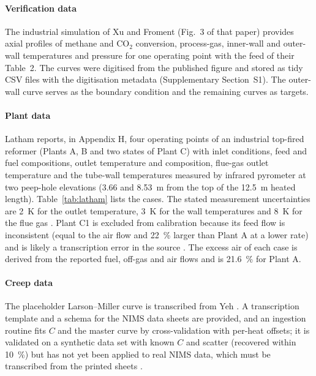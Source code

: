 \paragraph{Verification data} The industrial simulation of Xu and Froment \cite{xu1989b} (Fig.~3 of that paper) provides axial
profiles of methane and CO$_2$ conversion, process-gas, inner-wall and outer-wall temperatures and pressure for one operating point
with the feed of their Table~2. The curves were digitised from the published figure  and stored as tidy CSV files with the digitisation metadata (Supplementary Section~S1). The outer-wall curve serves as
the boundary condition and the remaining curves as targets.

\paragraph{Plant data} Latham \cite{latham2008} reports, in Appendix H, four operating points of an industrial top-fired reformer
(Plants A, B and two states of Plant C) with inlet conditions, feed and fuel compositions, outlet temperature and composition,
flue-gas outlet temperature and the tube-wall temperatures measured by infrared pyrometer at two peep-hole elevations (3.66 and
\SI{8.53}{m} from the top of the \SI{12.5}{m} heated length). Table~\ref{tab:latham} lists the cases. The stated measurement
uncertainties are \SI{2}{K} for the outlet temperature, \SI{3}{K} for the wall temperatures and \SI{8}{K} for the flue gas
. Plant C1 is excluded from calibration because
its feed flow is inconsistent (equal to the air flow and \SI{22}{\percent} larger than Plant A at a lower rate) and is likely a
transcription error in the source . The excess air of each case is derived from the
reported fuel, off-gas and air flows and is \SI{21.6}{\percent} for Plant A.

\paragraph{Creep data} The placeholder Larson--Miller curve is transcribed from Yeh \cite{yeh2021}. A transcription template and a
schema for the NIMS data sheets are provided, and an ingestion routine fits $C$ and the master curve by cross-validation with
per-heat offsets; it is validated on a synthetic data set with known $C$ and scatter (recovered within \SI{10}{\percent}) but has not
yet been applied to real NIMS data, which must be transcribed from the printed sheets .

